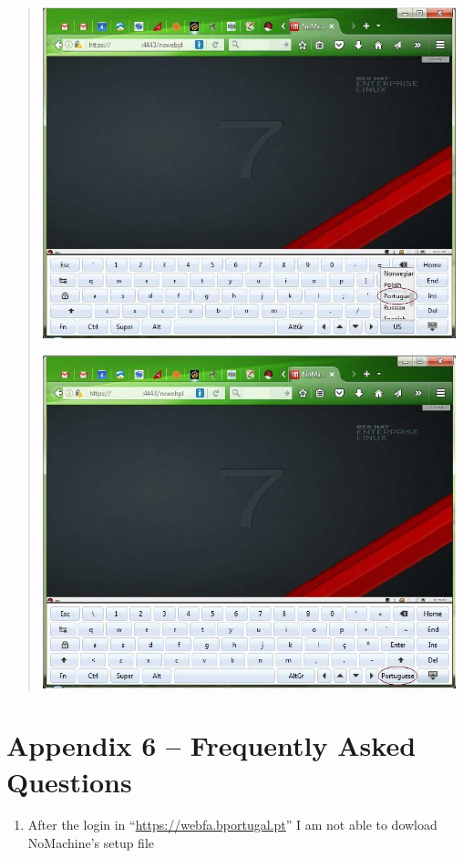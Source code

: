 \documentclass[]{book}
\providecommand{\tightlist}{%
  \setlength{\itemsep}{0pt}\setlength{\parskip}{0pt}}
\begin{document}
\begin{quote}
\includegraphics[width=4.72441in,height=3.77962in]{./media/image43.png}

\includegraphics[width=4.72441in,height=3.80386in]{./media/image44.png}
\end{quote}

\hypertarget{appendix-6-frequently-asked-questions}{%
\section{\texorpdfstring{{Appendix 6 -- Frequently Asked Questions}}{Appendix 6 -- Frequently Asked Questions}}\label{appendix-6-frequently-asked-questions}}

\begin{enumerate}
\def\labelenumi{\arabic{enumi}.}
\tightlist
\item
  After the login in ``\url{https://webfa.bportugal.pt}'' I am not able to
  dowload NoMachine's setup file
\end{enumerate}
\end{document}
